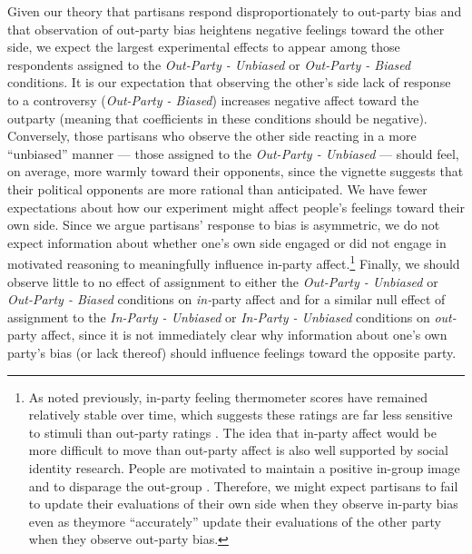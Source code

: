 \documentclass[12pt, letterpaper]{article}
\begin{document}
{Given our theory that partisans respond disproportionately to out-party bias and that observation of out-party bias heightens negative feelings toward the other side, we expect the largest experimental effects to appear among those respondents assigned to the \textit{Out-Party - Unbiased} or \textit{Out-Party - Biased} conditions. It is our expectation that observing the other's side lack of response  to a controversy (\textit{Out-Party - Biased}) increases negative affect toward the outparty (meaning that coefficients in these conditions should be negative). Conversely, those partisans who observe the other side reacting in a more ``unbiased'' manner --- those assigned to the \textit{Out-Party - Unbiased} --- should feel, on average, more warmly toward their opponents, since the vignette suggests that their political opponents are more rational than anticipated. We have fewer expectations about how our experiment might affect people's feelings toward their own side. Since we argue partisans' response to bias is asymmetric, we do not expect information about whether one's own side engaged or did not engage in motivated reasoning to meaningfully influence in-party affect.\footnote{As noted previously, in-party feeling thermometer scores have remained relatively stable over time, which suggests these ratings are far less sensitive to stimuli than out-party ratings \citep{haidthetherington_2012, IyengarSoodLelkes2012}. The idea that in-party affect would be more difficult to move than out-party affect is also well supported by social identity research. People are motivated to maintain a positive in-group image and to disparage the out-group \citep{tajfelturner_1979}. Therefore, we might expect partisans to fail to update their evaluations of their own side when they observe in-party bias even as theymore ``accurately'' update their evaluations of the other party when they observe out-party bias.} Finally, we should observe little to no effect of assignment to either the \textit{Out-Party - Unbiased} or \textit{Out-Party - Biased} conditions on \textit{in-}party affect and for a similar null effect of assignment to the \textit{In-Party - Unbiased} or \textit{In-Party - Unbiased} conditions on \textit{out-}party affect, since it is not immediately clear why information about one's own party's bias (or lack thereof) should influence feelings toward the opposite party. 

}
\end{document}
